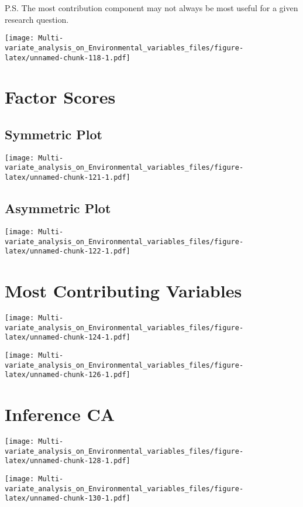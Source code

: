 \documentclass[]{book}
\begin{document}
P.S. The most contribution component may not always be most useful for a
given research question.

\texttt{[image: Multi-variate\_analysis\_on\_Environmental\_variables\_files/figure-latex/unnamed-chunk-118-1.pdf]}

\hypertarget{factor-scores-5}{%
\section{Factor Scores}\label{factor-scores-5}}

\hypertarget{symmetric-plot}{%
\subsection{Symmetric Plot}\label{symmetric-plot}}

\texttt{[image: Multi-variate\_analysis\_on\_Environmental\_variables\_files/figure-latex/unnamed-chunk-121-1.pdf]}

\hypertarget{asymmetric-plot}{%
\subsection{Asymmetric Plot}\label{asymmetric-plot}}

\texttt{[image: Multi-variate\_analysis\_on\_Environmental\_variables\_files/figure-latex/unnamed-chunk-122-1.pdf]}

\hypertarget{most-contributing-variables-2}{%
\section{Most Contributing
Variables}\label{most-contributing-variables-2}}

\texttt{[image: Multi-variate\_analysis\_on\_Environmental\_variables\_files/figure-latex/unnamed-chunk-124-1.pdf]}

\texttt{[image: Multi-variate\_analysis\_on\_Environmental\_variables\_files/figure-latex/unnamed-chunk-126-1.pdf]}

\hypertarget{inference-ca}{%
\section{Inference CA}\label{inference-ca}}

\texttt{[image: Multi-variate\_analysis\_on\_Environmental\_variables\_files/figure-latex/unnamed-chunk-128-1.pdf]}

\texttt{[image: Multi-variate\_analysis\_on\_Environmental\_variables\_files/figure-latex/unnamed-chunk-130-1.pdf]}
\end{document}
